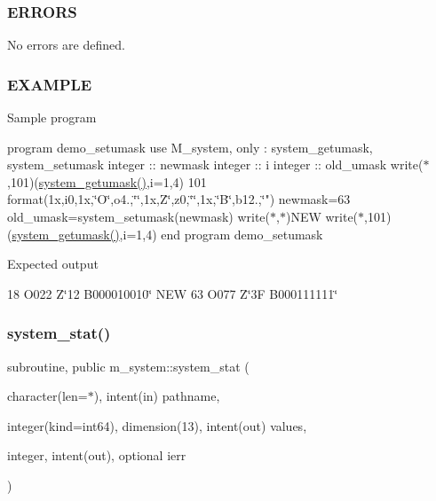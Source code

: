\subsubsection*{E\+R\+R\+O\+RS}

No errors are defined.

\subsubsection*{E\+X\+A\+M\+P\+LE}

Sample program

program demo\+\_\+setumask use M\+\_\+system, only \+: system\+\_\+getumask, system\+\_\+setumask integer \+:\+: newmask integer \+:\+: i integer \+:\+: old\+\_\+umask write($\ast$,101)(\mbox{\hyperlink{namespacem__system_aa9ca951be39d2ea738d627cf42c00ddd}{system\+\_\+getumask()}},i=1,4) 101 format(1x,i0,1x,\char`\"{}\+O\textquotesingle{}\char`\"{},o4.,\char`\"{}\textquotesingle{}\char`\"{},1x,\textquotesingle{}Z\char`\"{}\textquotesingle{},z0,\char`\"{}\textquotesingle{}\char`\"{},1x,\char`\"{}B\textquotesingle{}\char`\"{},b12.,\char`\"{}\textquotesingle{}") newmask=63 old\+\_\+umask=system\+\_\+setumask(newmask) write($\ast$,$\ast$)\textquotesingle{}N\+EW\textquotesingle{} write($\ast$,101)(\mbox{\hyperlink{namespacem__system_aa9ca951be39d2ea738d627cf42c00ddd}{system\+\_\+getumask()}},i=1,4) end program demo\+\_\+setumask

Expected output

18 O\textquotesingle{}022\textquotesingle{} Z\char`\"{}12\textquotesingle{} B\textquotesingle{}000010010\char`\"{} N\+EW 63 O\textquotesingle{}077\textquotesingle{} Z\char`\"{}3\+F\textquotesingle{} B\textquotesingle{}000111111\char`\"{} \mbox{\label{namespacem__system_a5bb1ebcebe181e07fd24e908cacc9887}} 
\subsubsection{\texorpdfstring{system\+\_\+stat()}{system\_stat()}}
{\footnotesize\ttfamily subroutine, public m\+\_\+system\+::system\+\_\+stat (\begin{DoxyParamCaption}\item[{character(len=$\ast$), intent(in)}]{pathname,  }\item[{integer(kind=int64), dimension(13), intent(out)}]{values,  }\item[{integer, intent(out), optional}]{ierr }\end{DoxyParamCaption})}



